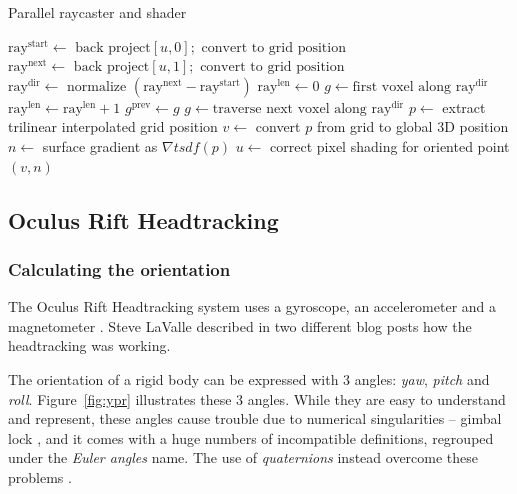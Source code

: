 \documentclass[12pt]{article}
\begin{document}
\begin{algorithm}
\caption{Parallel raycaster and shader}\label{algo3}
\begin{algorithmic}[1]
  \State $\text{ray}^{\text{start}} \gets \text{ back project} [u,0]; \text{ convert to grid position}$
  \State $\text{ray}^{\text{next}} \gets \text{ back project} [u,1]; \text{ convert to grid position}$
  \State $\text{ray}^{\text{dir}} \gets \text{ normalize }(\text{ray}^{\text{next}}-\text{ray}^{\text{start}})$
  \State $\text{ray}^{\text{len}} \gets 0$
  \State $g \gets \text{first voxel along } \text{ray}^{\text{dir}}$
    \State $\text{ray}^{\text{len}} \gets \text{ray}^{\text{len}} + 1$
    \State $g^{\text{prev}} \gets g$
    \State $g \gets \text{traverse next voxel along }\text{ray}^{\text{dir}}$
      \State $p \gets$ extract trilinear interpolated grid position
      \State $v \gets$ convert $p$ from grid to global 3D position
      \State $n \gets$ surface gradient as $\nabla tsdf(p)$
      \State $u \gets$ correct pixel shading for oriented point $(v,n)$
      \EndIf
    \EndWhile
\EndFor
\end{algorithmic}
\end{algorithm}

\subsection{Oculus Rift Headtracking}
\subsubsection{Calculating the orientation}
The Oculus Rift Headtracking system uses a gyroscope, an accelerometer and a magnetometer \cite{Oculus2}. Steve LaValle described in two different blog posts \cite{OculusBlog1, OculusBlog2} how the headtracking was working.

The orientation of a rigid body can be expressed with 3 angles: \textit{yaw}, \textit{pitch} and \textit{roll}. Figure~\ref{fig:ypr} illustrates these 3 angles. While they are easy to understand and represent, these angles cause trouble due to numerical singularities -- gimbal lock \cite{lock}, and it comes with a huge numbers of incompatible definitions, regrouped under the \textit{Euler angles} name. The use of \textit{quaternions} instead overcome these problems \cite{Quat}.
\end{document}
